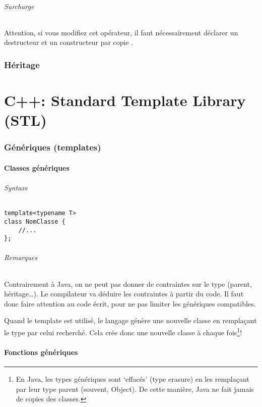 \documentclass[10pt,a4paper,french]{article}
\let\oldpart\part
\renewcommand\part{\newpage\oldpart}
\begin{document}
\paragraph{Surcharge}
Attention, si vous modifiez cet opérateur, il faut nécessairement déclarer un destructeur  et un constructeur par copie .

\section{Héritage}

\part{C++: Standard Template Library (STL)}

\section{Génériques (templates)}

\subsection{Classes génériques}

\paragraph{Syntaxe}
\begin{verbatim}
template<typename T>
class NomClasse {
    //...
};
\end{verbatim}

\paragraph{Remarques}
Contrairement à Java, on ne peut pas donner de contraintes sur le type (parent, héritage\ldots). Le compilateur va déduire les contraintes à partir du code. Il faut donc faire attention au code écrit, pour ne pas limiter les génériques compatibles.

Quand le template est utilisé, le langage génère une nouvelle classe en remplaçant le type par celui recherché. Cela crée donc une nouvelle classe à chaque fois\footnote{En Java, les types génériques sont `effacés' (type erasure) en les remplaçant par leur type parent (souvent, Object). De cette manière, Java ne fait jamais de copies des classes.}!

\subsection{Fonctions génériques}
\end{document}
